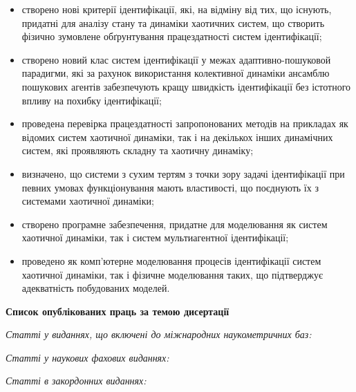 \documentclass[a4paper,13pt]{atuaref}
\newcommand{\xsect}[1]{\vspace{0.15ex}\begin{center}\textbf{#1}\end{center}\vspace{4pt}\penalty10000}
\newcommand{\xxxsect}[1]{\vspace{0.02ex}\textit{#1}\vspace{0.02ex}\penalty10000}
\begin{document}
\begin{itemize}

  \item
    створено нові критерії ідентифікації, які, на відміну від тих, що
    існують, придатні для аналізу стану та динаміки
    хаотичних систем, що створить фізично зумовлене обґрунтування працездатності систем
    ідентифікації;

  \item
    створено новий клас систем ідентифікації у межах
    адаптивно-пошуковой парадигми,
    які за рахунок використання колективної динаміки
    ансамблю пошукових агентів забезпечують
    кращу швидкість ідентифікації без істотного впливу на похибку ідентифікації;

  \item
    проведена перевірка працездатності запропонованих методів
    на прикладах як відомих систем хаотичної динаміки,
    так і на декількох інших динамічних систем, які проявляють
    складну та хаотичну динаміку;

  \item
   визначено, що системи з сухим тертям з точки зору задачі ідентифікації
   при певних  умовах функціонування
   мають властивості, що поєднують їх з системами хаотичної динаміки;

 \item
  створено програмне забезпечення, придатне для моделювання як систем
  хаотичної динаміки, так і систем мультиагентної ідентифікації;

  \item
  проведено як комп'ютерне моделювання процесів ідентифікації систем
  хаотичної динаміки, так і фізичне моделювання таких, що підтверджує адекватність
  побудованих моделей.


\end{itemize}



\nocite{*}

\xsect{Список опублікованих праць за темою дисертації}

\xxxsect{Статті у виданнях, що включені до міжнародних наукометричних баз:}

\printbibliography[heading=none, keyword=scimetr]


\xxxsect{Статті у наукових фахових виданнях:}

\printbibliography[heading=none, keyword=vak]

\xxxsect{Статті в закордонних виданнях:}

\printbibliography[heading=none, keyword=foreign]
\end{document}
